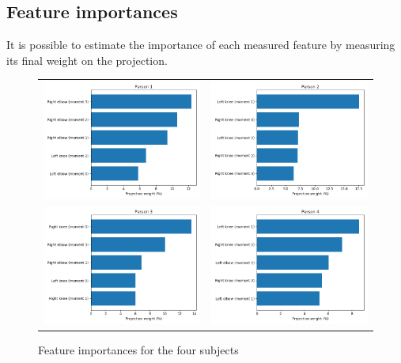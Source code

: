 \documentclass{bmvc2k}
\begin{document}
\subsection{Feature importances}

It is possible to estimate the importance of each measured feature by measuring its final weight on the projection\cite{statanalysis}.

\begin{figure}[H]
   \begin{center}
      \begin{tabular}{c c}
         \includegraphics[width=6cm]{figures/person1Imp.png}&\includegraphics[width=6cm]{figures/person2Imp.png}\\
         \includegraphics[width=6cm]{figures/person3Imp.png}&\includegraphics[width=6cm]{figures/person4Imp.png}
      \end{tabular}
   \end{center}
   \caption{Feature importances for the four subjects}
\end{figure}
\end{document}
